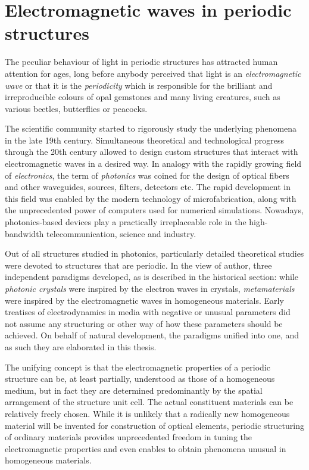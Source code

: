 
\section{Electromagnetic waves in periodic structures} %
The peculiar behaviour of light in periodic structures has attracted human attention for ages, long before anybody perceived that light is an \textit{electromagnetic wave} or that it is the \textit{periodicity} which is responsible for the brilliant and irreproducible colours of opal gemstones and many living creatures, such as various beetles, butterflies or peacocks. 

The scientific community started to rigorously study the underlying phenomena in the late 19th century.
Simultaneous theoretical and technological progress through the 20th century allowed to design custom structures that interact with electromagnetic waves in a desired way. In analogy with the rapidly growing field of \textit{electronics}, the term of \textit{photonics} was coined for the design of optical fibers and other waveguides, sources, filters, detectors etc. The rapid development in this field was enabled by the modern technology of microfabrication, along with the unprecedented power of computers used for numerical simulations. Nowadays, photonics-based devices play a practically irreplaceable role in the high-bandwidth telecommunication, science and industry.

Out of all structures studied in photonics, particularly detailed theoretical studies were devoted to structures that are periodic. %
In the view of author, three independent paradigms developed, as is described in the historical section: while \textit{photonic crystals} were inspired by the electron waves in crystals, \textit{metamaterials} were inspired by the electromagnetic waves in homogeneous materials. Early treatises of electrodynamics in media with negative or unusual parameters did not assume any structuring or other way of how these parameters should be achieved. On behalf of natural development, the paradigms unified into one, and as such they are elaborated in this thesis. 

The unifying concept is that the electromagnetic properties of a periodic structure can be, at least partially, understood as those of a homogeneous medium, but in fact they are determined predominantly by the spatial arrangement of the structure unit cell. The actual constituent materials can be relatively freely chosen. %
While it is unlikely that a radically new homogeneous material will be invented for construction of optical elements, periodic structuring of ordinary materials provides unprecedented freedom in tuning the electromagnetic properties and even enables to obtain phenomena unusual in homogeneous materials. 

